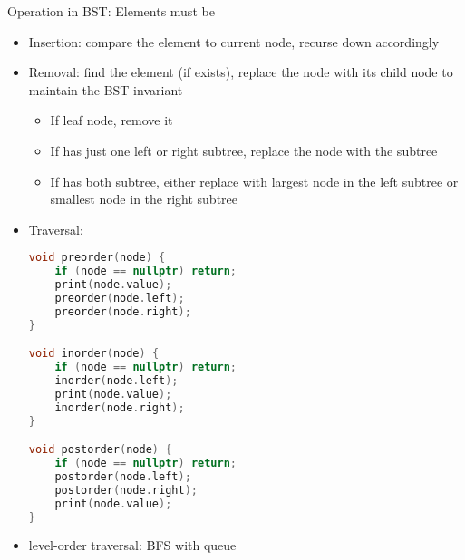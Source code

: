 Operation in \ac{BST}: Elements must be 
\begin{itemize}
	\item Insertion: compare the element to current node, recurse down accordingly
	\item Removal: find the element (if exists), replace the node with its child node to maintain the \ac{BST} invariant
	\begin{itemize}
		\item If leaf node, remove it
		\item If has just one left or right subtree, replace the node with the subtree
		\item If has both subtree, either replace with largest node in the left subtree or smallest node in the right subtree
	\end{itemize}
	\item Traversal:
\begin{lstlisting}[language=C++]
void preorder(node) {
	if (node == nullptr) return;
	print(node.value);
	preorder(node.left);
	preorder(node.right);
}

void inorder(node) {
	if (node == nullptr) return;
	inorder(node.left);
	print(node.value);
	inorder(node.right);
}

void postorder(node) {
	if (node == nullptr) return;
	postorder(node.left);
	postorder(node.right);
	print(node.value);
}
\end{lstlisting}
	\item level-order traversal: \ac{BFS} with queue
\end{itemize}

